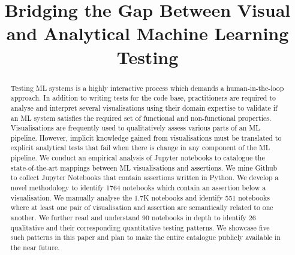 \documentclass[conference]{IEEEtran}
\begin{document}
\title{Bridging the Gap Between Visual and Analytical Machine Learning
  Testing}

\author{
\and
{}
\and
{}
}

\maketitle

\begin{abstract}

Testing ML systems is a highly interactive process which demands a human-in-the-loop approach. In addition to writing tests for the code base, practitioners are required to analyse and interpret several visualisations using their domain expertise to validate if an ML system satisfies the required set of functional and non-functional properties. Visualisations are frequently used to qualitatively assess various parts of an ML pipeline. However, implicit knowledge gained from visualisations must be translated to explicit analytical tests that fail when there is change in any component of the ML pipeline. We conduct an empirical analysis of Jupyter notebooks to catalogue the state-of-the-art mappings between ML visualisations and assertions. We mine Github to collect Jupyter Notebooks that contain assertions written in Python. We develop a novel methodology to identify 1764 notebooks which contain an assertion below a visualisation. We manually analyse the 1.7K notebooks and identify 551 notebooks where at least one pair of visualisation and assertion are semantically related to one another. We further read and understand 90 notebooks in depth to identify 26 qualitative and their corresponding quantitative testing patterns. We showcase five such patterns in this paper and plan to make the entire catalogue publicly available in the near future.


\end{abstract}
\end{document}
